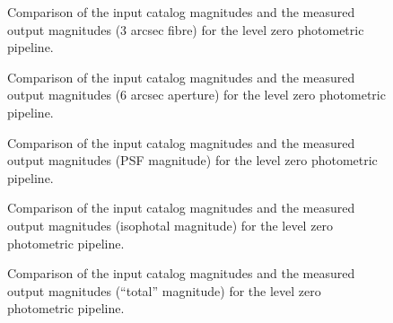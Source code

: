 \begin{figure}
\caption{Comparison of the input catalog magnitudes and the measured 
output magnitudes (3 arcsec fibre) for the level zero photometric pipeline.}
\end{figure}

\begin{figure}
\caption{Comparison of the input catalog magnitudes and the measured 
output magnitudes (6 arcsec aperture) for the level zero photometric pipeline.}
\end{figure}

\begin{figure}
\caption{Comparison of the input catalog magnitudes and the measured 
output magnitudes (PSF magnitude) for the level zero photometric pipeline.}
\end{figure}

\begin{figure}
\caption{Comparison of the input catalog magnitudes and the measured 
output magnitudes (isophotal magnitude) for the level zero photometric 
pipeline.}
\end{figure}


\begin{figure}
\caption{Comparison of the input catalog magnitudes and the measured 
output magnitudes (``total'' magnitude) for the level zero photometric 
pipeline.}
\end{figure}


